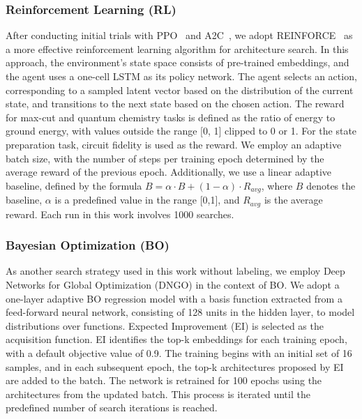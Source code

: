 \documentclass{article} %
\begin{document}
\subsubsection{Reinforcement Learning (RL)}
After conducting initial trials with PPO~\citep{schulman2017proximal} and A2C~\citep{huang2022a2c}, we adopt REINFORCE~\citep{Williams:92} as a more effective reinforcement learning algorithm for architecture search. In this approach, the environment's state space consists of pre-trained embeddings, and the agent uses a one-cell LSTM as its policy network. The agent selects an action, corresponding to a sampled latent vector based on the distribution of the current state, and transitions to the next state based on the chosen action. The reward for max-cut and quantum chemistry tasks is defined as the ratio of energy to ground energy, with values outside the range [0, 1] clipped to 0 or 1. For the state preparation task, circuit fidelity is used as the reward.
We employ an adaptive batch size, with the number of steps per training epoch determined by the average reward of the previous epoch. Additionally, we use a linear adaptive baseline, defined by the formula $B = \alpha \cdot B + (1 - \alpha) \cdot R_{avg}$, where $B$ denotes the baseline, $\alpha$ is a predefined value in the range [0,1], and $R_{avg}$ is the average reward. Each run in this work involves 1000 searches.

\subsubsection{Bayesian Optimization (BO)}
As another search strategy used in this work without labeling, we employ Deep Networks for Global Optimization (DNGO)\citep{snoek2015scalable} in the context of BO. We adopt a one-layer adaptive BO regression model with a basis function extracted from a feed-forward neural network, consisting of 128 units in the hidden layer, to model distributions over functions. Expected Improvement (EI)\citep{conf/ifip/Mockus77} is selected as the acquisition function. EI identifies the top-k embeddings for each training epoch, with a default objective value of 0.9. The training begins with an initial set of 16 samples, and in each subsequent epoch, the top-k architectures proposed by EI are added to the batch. The network is retrained for 100 epochs using the architectures from the updated batch. This process is iterated until the predefined number of search iterations is reached.
\end{document}
